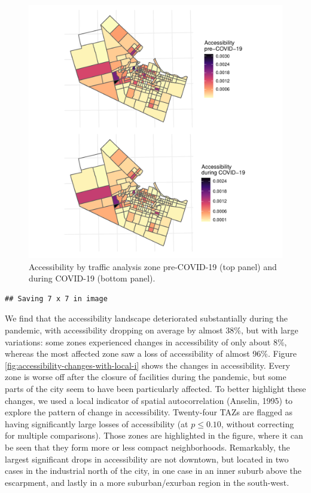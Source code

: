 \documentclass[]{elsarticle} %
\begin{document}
\begin{figure}

{\centering \includegraphics[width=1\linewidth]{Accessibility-Foodbanks-Hamilton_files/figure-latex/plot-accessibility-1} 

}

\caption{\label{fig:accessibility}Accessibility by traffic analysis zone pre-COVID-19 (top panel) and during COVID-19 (bottom panel).}\label{fig:plot-accessibility}
\end{figure}

\begin{verbatim}
## Saving 7 x 7 in image
\end{verbatim}

We find that the accessibility landscape deteriorated substantially
during the pandemic, with accessibility dropping on average by almost
38\%, but with large variations: some zones experienced changes in
accessibility of only about 8\%, whereas the most affected zone saw a
loss of accessibility of almost 96\%. Figure
\ref{fig:accessibility-changes-with-local-i} shows the changes in
accessibility. Every zone is worse off after the closure of facilities
during the pandemic, but some parts of the city seem to have been
particularly affected. To better highlight these changes, we used a
local indicator of spatial autocorrelation (Anselin, 1995) to explore
the pattern of change in accessibility. Twenty-four TAZs are flagged as
having significantly large losses of accessibility (at \(p\le 0.10\),
without correcting for multiple comparisons). Those zones are
highlighted in the figure, where it can be seen that they form more or
less compact neighborhoods. Remarkably, the largest significant drops in
accessibility are not downtown, but located in two cases in the
industrial north of the city, in one case in an inner suburb above the
escarpment, and lastly in a more suburban/exurban region in the
south-west.
\end{document}
